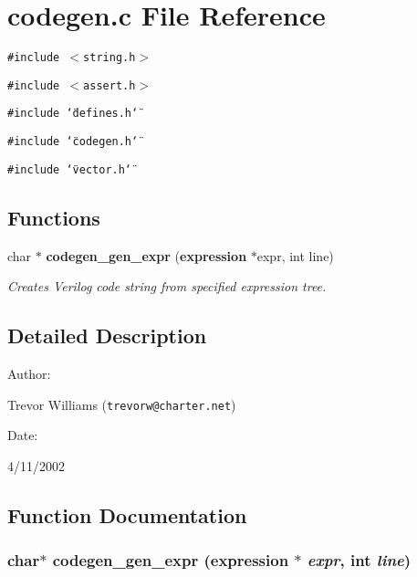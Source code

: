 \section{codegen.c File Reference}
\label{codegen_8c}
{\tt \#include $<$string.h$>$}\par
{\tt \#include $<$assert.h$>$}\par
{\tt \#include \char`\"{}defines.h\char`\"{}}\par
{\tt \#include \char`\"{}codegen.h\char`\"{}}\par
{\tt \#include \char`\"{}vector.h\char`\"{}}\par
\subsection*{Functions}
\begin{CompactItemize}
\item 
char $\ast$ {\bf codegen\_\-gen\_\-expr} ({\bf expression} $\ast$expr, int line)
\begin{CompactList}\small\item\em Creates Verilog code string from specified expression tree.\item\end{CompactList}\end{CompactItemize}


\subsection{Detailed Description}


\begin{Desc}
\item[Author: ]\par
Trevor Williams ({\tt trevorw@charter.net}) \end{Desc}
\begin{Desc}
\item[Date: ]\par
4/11/2002\end{Desc}


\subsection{Function Documentation}
\subsubsection{\setlength{\rightskip}{0pt plus 5cm}char$\ast$ codegen\_\-gen\_\-expr ({\bf expression} $\ast$ {\em expr}, int {\em line})}\label{codegen_8c_a0}


